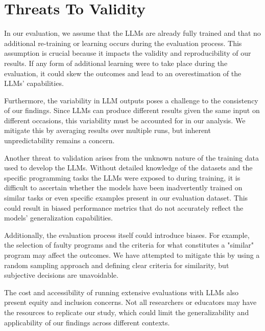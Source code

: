 \section{Threats To Validity}
In our evaluation, we assume that the LLMs are already fully trained and that no additional re-training or learning occurs during the evaluation process. This assumption is crucial because it impacts the validity and reproducibility of our results. If any form of additional learning were to take place during the evaluation, it could skew the outcomes and lead to an overestimation of the LLMs' capabilities.

Furthermore, the variability in LLM outputs poses a challenge to the consistency of our findings. Since LLMs can produce different results given the same input on different occasions, this variability must be accounted for in our analysis. We mitigate this by averaging results over multiple runs, but inherent unpredictability remains a concern.

Another threat to validation arises from the unknown nature of the training data used to develop the LLMs. Without detailed knowledge of the datasets and the specific programming tasks the LLMs were exposed to during training, it is difficult to ascertain whether the models have been inadvertently trained on similar tasks or even specific examples present in our evaluation dataset. This could result in biased performance metrics that do not accurately reflect the models' generalization capabilities.

Additionally, the evaluation process itself could introduce biases. For example, the selection of faulty programs and the criteria for what constitutes a "similar" program may affect the outcomes. We have attempted to mitigate this by using a random sampling approach and defining clear criteria for similarity, but subjective decisions are unavoidable.

The cost and accessibility of running extensive evaluations with LLMs also present equity and inclusion concerns. Not all researchers or educators may have the resources to replicate our study, which could limit the generalizability and applicability of our findings across different contexts.

